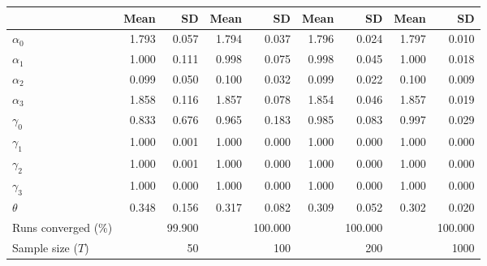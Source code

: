 
\begin{tabular}[t]{lrrrrrrrr}
\toprule
  & Mean & SD & Mean  & SD  & Mean   & SD   & Mean    & SD   \\
\midrule
$\alpha_{0}$ & 1.793 & 0.057 & 1.794 & 0.037 & 1.796 & 0.024 & 1.797 & 0.010\\
$\alpha_{1}$ & 1.000 & 0.111 & 0.998 & 0.075 & 0.998 & 0.045 & 1.000 & 0.018\\
$\alpha_{2}$ & 0.099 & 0.050 & 0.100 & 0.032 & 0.099 & 0.022 & 0.100 & 0.009\\
$\alpha_{3}$ & 1.858 & 0.116 & 1.857 & 0.078 & 1.854 & 0.046 & 1.857 & 0.019\\
$\gamma_{0}$ & 0.833 & 0.676 & 0.965 & 0.183 & 0.985 & 0.083 & 0.997 & 0.029\\
$\gamma_{1}$ & 1.000 & 0.001 & 1.000 & 0.000 & 1.000 & 0.000 & 1.000 & 0.000\\
$\gamma_{2}$ & 1.000 & 0.001 & 1.000 & 0.000 & 1.000 & 0.000 & 1.000 & 0.000\\
$\gamma_{3}$ & 1.000 & 0.000 & 1.000 & 0.000 & 1.000 & 0.000 & 1.000 & 0.000\\
$\theta$ & 0.348 & 0.156 & 0.317 & 0.082 & 0.309 & 0.052 & 0.302 & 0.020\\
Runs converged (\%) &  & 99.900 &  & 100.000 &  & 100.000 &  & 100.000\\
Sample size ($T$) &  & 50 &  & 100 &  & 200 &  & 1000\\
\bottomrule
\end{tabular}
